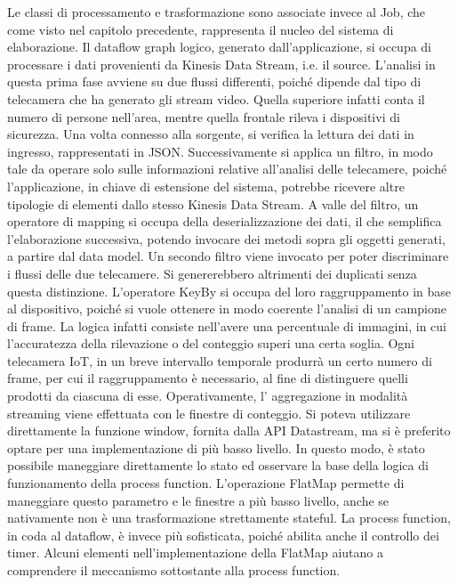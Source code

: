 Le classi di processamento e trasformazione sono associate invece al Job, che come visto nel capitolo precedente, rappresenta il nucleo del sistema di elaborazione. Il dataflow graph logico, generato dall'applicazione, si occupa di processare i dati provenienti da Kinesis Data Stream, i.e. il source. L'analisi in questa prima fase avviene su due flussi differenti, poiché  dipende dal tipo di telecamera che ha generato gli stream video. Quella superiore infatti conta il numero di persone nell'area, mentre quella frontale rileva i dispositivi di sicurezza. Una volta connesso alla sorgente, si verifica la lettura dei dati in ingresso, rappresentati in JSON. Successivamente si applica un filtro, in modo tale da operare solo sulle informazioni relative all'analisi delle telecamere, poiché l'applicazione, in chiave di estensione del sistema, potrebbe ricevere altre tipologie di elementi dallo stesso Kinesis Data Stream. A valle del filtro, un operatore di mapping si occupa della deserializzazione dei dati, il che semplifica l'elaborazione successiva, potendo invocare dei metodi sopra gli oggetti generati, a partire dal data model. Un secondo filtro viene invocato per poter discriminare i flussi delle due telecamere. Si genererebbero altrimenti dei duplicati senza questa distinzione. L'operatore KeyBy si occupa del loro raggruppamento in base al dispositivo, poiché si vuole ottenere in modo coerente l'analisi di un campione di frame. La logica infatti consiste nell'avere una percentuale di immagini, in cui l'accuratezza della rilevazione o del conteggio superi una certa soglia. Ogni telecamera IoT, in un breve intervallo temporale produrrà un certo numero di frame, per cui il raggruppamento è necessario, al fine di distinguere quelli prodotti da ciascuna di esse. Operativamente, l' aggregazione in modalità streaming viene effettuata con le finestre di conteggio. Si poteva utilizzare direttamente la funzione window, fornita dalla API Datastream, ma si è preferito optare per una implementazione di più basso livello. In questo modo, è stato possibile maneggiare direttamente lo stato ed osservare la base della logica di funzionamento della process function. L'operazione FlatMap permette di maneggiare questo parametro e le finestre a più basso livello, anche se nativamente non è una trasformazione strettamente stateful. La process function,  in coda al dataflow, è invece più sofisticata, poiché abilita anche il controllo dei timer. Alcuni elementi nell'implementazione della FlatMap aiutano a comprendere il meccanismo sottostante alla process function.

